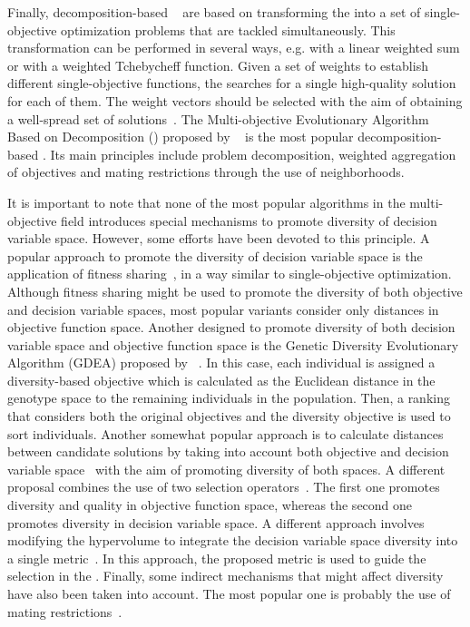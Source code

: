 Finally, decomposition-based \MOEAS{}~\citep{Joel:MOEAD_AMS} are based on transforming the \MOP{} into a set of 
single-objective optimization problems that are tackled simultaneously.
%
This transformation can be performed in several ways, e.g. with a linear weighted sum or with a weighted Tchebycheff function. 
%
Given a set of weights to establish different single-objective functions, the \MOEA{} searches for a single 
high-quality solution for each of them. 
%
The weight vectors should be selected with the aim of obtaining a well-spread set of solutions~\citep{Joel:Kalyanmoy}.
%
The Multi-objective Evolutionary Algorithm Based on Decomposition (\MOEAD{}) proposed by ~\cite{Joel:MOEAD} is the most popular 
decomposition-based \MOEA{}. 
%
Its main principles include problem decomposition, weighted aggregation of objectives and mating restrictions 
through the use of neighborhoods. 

It is important to note that none of the most popular algorithms in the multi-objective field introduces special 
mechanisms to promote diversity of decision variable space.
%
However, some efforts have been devoted to this principle.
%
A popular approach to promote the diversity of decision variable space is the application of fitness sharing~\citep{Joel:NPGA}, 
in a way similar to single-objective optimization.
%
Although fitness sharing might be used to promote the diversity of both objective and decision variable spaces, most
popular variants consider only distances in objective function space.
% 
Another \MOEA{} designed to promote diversity of both decision variable space and objective function space is the Genetic
Diversity Evolutionary Algorithm (GDEA) proposed by ~\cite{toffolo2003genetic}.
%
In this case, each individual is assigned a diversity-based objective which is calculated as the
Euclidean distance in the genotype space to the remaining individuals in the population.
%
Then, a ranking that considers both the original objectives and the diversity objective is used
to sort individuals.
%
Another somewhat popular approach is to calculate distances between candidate solutions by taking
into account both objective and decision variable space~\citep{deb2005omni,shir2009enhancing} with the aim
of promoting diversity of both spaces.
%
A different proposal combines the use of two selection operators~\citep{chan2005evolutionary}.
%
The first one promotes diversity and quality in objective function space, whereas the second one promotes diversity 
in decision variable space.
%
A different approach involves modifying the hypervolume to integrate the decision variable space diversity 
into a single metric~\citep{ulrich2010integrating}.
% 
In this approach, the proposed metric is used to guide the selection in the \MOEA{}.
%
Finally, some indirect mechanisms that might affect diversity have also been taken into account.
%
The most popular one is probably the use of mating restrictions~\citep{Joel:STUDY_MATTING_RESTRICTION,Joel:MOEAD_AMS}.

